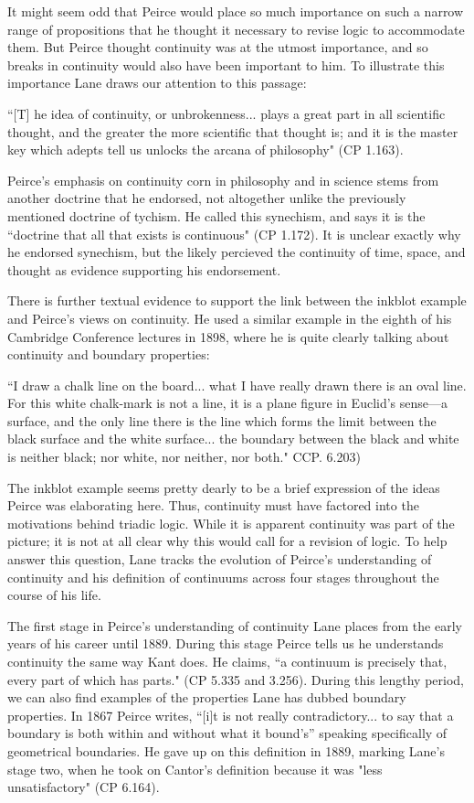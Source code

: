 \documentclass[12pt]{article}
\begin{document}
 It might seem odd that Peirce would place so much importance on such a narrow range of propositions that he thought it necessary to revise logic to accommodate them. But Peirce thought continuity was at the utmost importance, and so breaks in continuity would also have been important to him. To illustrate this importance Lane draws our attention to this passage:
 \begin{singlespace}
``[T] he idea of continuity, or unbrokenness... plays a great part in all scientific thought, and the greater the more scientific that thought is; and it is the master key which adepts tell us unlocks the arcana of philosophy" (CP 1.163).
\end{singlespace}
\noindent Peirce's emphasis on continuity corn in philosophy and in science stems from another doctrine that he endorsed, not altogether unlike the previously mentioned doctrine of tychism. He called this synechism, and says it is the ``doctrine that all that exists is continuous" (CP 1.172). It is unclear exactly why he endorsed synechism, but the likely percieved the continuity of time, space, and thought as evidence supporting his endorsement.

There is further textual evidence to support the link between the inkblot example and Peirce's views on continuity. He used a similar example in the eighth of his Cambridge Conference lectures in 1898, where he is quite clearly talking about continuity and boundary properties:
\begin{singlespace}
``I draw a chalk line on the board... what I have really drawn there is an oval line. For this white chalk-mark is not a line, it is a plane figure in Euclid’s sense---a surface, and the only line there is the line which forms the limit between the black surface and the white surface... the boundary between the black and white is neither black; nor white, nor neither, nor both." CCP. 6.203)
\end{singlespace}
\noindent The inkblot example seems pretty dearly to be a brief expression of the ideas Peirce was elaborating here. Thus, continuity must have factored into the motivations behind triadic logic. While it is apparent continuity was part of the picture; it is not at all clear why this would call for a revision of logic. To help answer this question, Lane tracks the evolution of Peirce’s understanding of continuity and his definition of continuums across four stages throughout the course of his life.

The first stage in Peirce's understanding of continuity Lane places from the early years of his career until 1889. During this stage Peirce tells us he understands continuity the same way Kant does. He claims, ``a continuum is precisely that, every part of which has parts." (CP 5.335 and 3.256). During this lengthy period, we can also find examples of the properties Lane has dubbed boundary properties. In 1867 Peirce  writes, ``[i]t is not really contradictory... to say that a boundary is both within and without what it bound's” speaking specifically of geometrical boundaries. He gave up on this definition in 1889, marking Lane's stage two, when he took on Cantor's definition because it was "less unsatisfactory" (CP 6.164).
\end{document}
